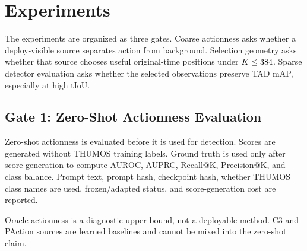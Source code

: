 \section{Experiments}

The experiments are organized as three gates. Coarse actionness asks whether a
deploy-visible source separates action from background. Selection geometry asks
whether that source chooses useful original-time positions under $K\le384$.
Sparse detector evaluation asks whether the selected observations preserve TAD
mAP, especially at high tIoU.

\subsection{Gate 1: Zero-Shot Actionness Evaluation}

Zero-shot actionness is evaluated before it is used for detection. Scores are
generated without THUMOS training labels. Ground truth is used only after score
generation to compute AUROC, AUPRC, Recall@K, Precision@K, and class balance.
Prompt text, prompt hash, checkpoint hash, whether THUMOS class names are used,
frozen/adapted status, and score-generation cost are reported.

\begin{table}[t]
\centering
\caption{Coarse actionness protocol. Scores are generated before labels are
used for evaluation; ``names only'' variants are reported separately from
generic zero-shot prompts.}
\label{tab:zs_actionness}
\setlength{\tabcolsep}{2pt}
\small
{}
\end{table}

Oracle actionness is a diagnostic upper bound, not a deployable method. C3 and
PAction sources are learned baselines and cannot be mixed into the zero-shot
claim.


